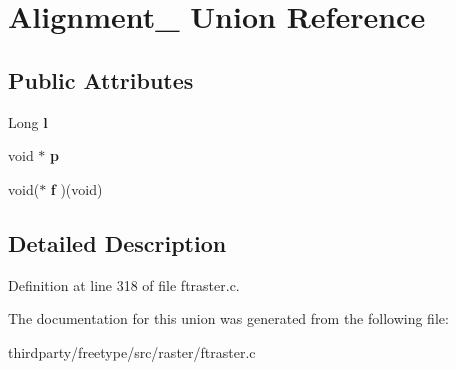 \hypertarget{union_alignment__}{}\section{Alignment\+\_\+ Union Reference}
\label{union_alignment__}
\subsection*{Public Attributes}
\begin{DoxyCompactItemize}
\item 
\mbox{\label{union_alignment___af54aa113ef97001ace792d354192edea}} 
Long {\bfseries l}
\item 
\mbox{\label{union_alignment___a1b4ee27d099055fe4f3ecfe1ecfa6ff2}} 
void $\ast$ {\bfseries p}
\item 
\mbox{\label{union_alignment___a620e1f14ecf4142e5e78fa1fd92e9e09}} 
void($\ast$ {\bfseries f} )(void)
\end{DoxyCompactItemize}


\subsection{Detailed Description}


Definition at line 318 of file ftraster.\+c.



The documentation for this union was generated from the following file\+:\begin{DoxyCompactItemize}
\item 
thirdparty/freetype/src/raster/ftraster.\+c\end{DoxyCompactItemize}
